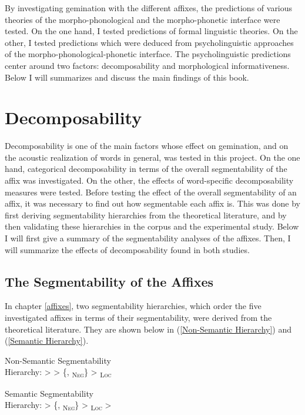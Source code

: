 By investigating gemination with the different affixes, the predictions of various theories of the morpho-phonological and the morpho-phonetic interface were tested. On the one hand, I tested predictions of formal linguistic theories. On the other, I tested predictions which were deduced from psycholinguistic approaches of the morpho-phonological-phonetic interface. The psycholinguistic predictions center around two factors: decomposability and morphological informativeness.  Below I will summarizes and discuss the main findings of this book.



\section{Decomposability}

Decomposability is one of the main factors whose effect on gemination, and on the acoustic realization of words in general, was tested in this project. On the one hand, categorical decomposability in terms of the overall segmentability of the affix was investigated. On the other, the effects of word-specific decomposability measures were tested. 
Before testing the effect of the overall segmentability of an affix, it was necessary to find out how segmentable each affix is. This was done by first deriving segmentability hierarchies from the theoretical literature, and by then validating these hierarchies  in the corpus and the experimental study. Below I will first give a summary of the segmentability analyses of the affixes. Then, I will summarize the effects of decomposability found in both studies.



\subsection{The Segmentability of the Affixes}

In chapter \ref{affixes}, two segmentability hierarchies, which order the five investigated affixes in terms of their segmentability, were derived from the theoretical literature. They are shown below in (\ref{Non-Semantic Hierarchy})  and (\ref{Semantic Hierarchy}). 


	\begin{exe}
		\ex \label{Non-Semantic Hierarchy} {Non-Semantic Segmentability }\\
		Hierarchy:\hspace*{3.5cm}   >  > \{, \textsubscript{\textsc{Neg}}\} >  \textsubscript{\textsc{Loc}}
		
				\ex \label{Semantic Hierarchy} 	{Semantic Segmentability }\\
				Hierarchy: \hspace*{3.5cm}  > \{, \textsubscript{\textsc{Neg}}\} >  \textsubscript{\textsc{Loc}} > 
	\end{exe}

